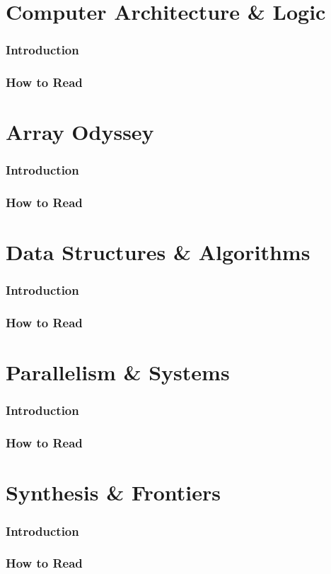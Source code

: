 \documentclass[12pt, oneside, openany]{book}
\begin{document}
\part{Computer Architecture \& Logic}
\section*{Introduction}
\section*{How to Read}
\part{Array Odyssey}
\section*{Introduction}
\section*{How to Read}
\part{Data Structures \& Algorithms}
\section*{Introduction}
\section*{How to Read}
\part{Parallelism \& Systems}
\section*{Introduction}
\section*{How to Read}
\part{Synthesis \& Frontiers}
\section*{Introduction}
\section*{How to Read}


\end{document}
